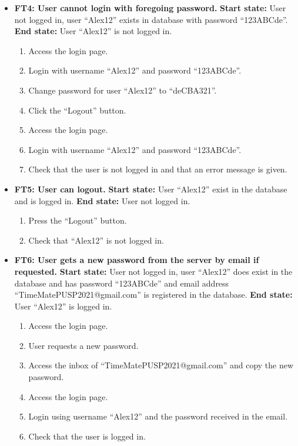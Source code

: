\documentclass{article}
\begin{document}
\begin{itemize}
		\item \textbf{FT4: User cannot login with foregoing password.} \newline
		\textbf{Start state:} User not logged in, user “Alex12” exists in database with password “123ABCde”.  \newline
		\textbf{End state:} User “Alex12” is not logged in.   
		\begin{enumerate}
			\item Access the login page. 
			\item Login with username “Alex12” and password “123ABCde”.
			\item Change password for user “Alex12” to “deCBA321”.
			\item Click the “Logout” button.
			\item Access the login page. 
			\item Login with username “Alex12” and password “123ABCde”.
			\item Check that the user is not logged in and that an error message is given. 
		\end{enumerate}
		
		\item \textbf{FT5: User can logout.} \newline
		\textbf{Start state:} User “Alex12” exist in the database and is logged in. \newline
		\textbf{End state:} User not logged in.   
		\begin{enumerate}
			\item Press the “Logout” button. 
			\item Check that “Alex12” is not logged in. 
		\end{enumerate}
		
		\item \textbf{FT6: User gets a new password from the server by email if requested.} \newline
		\textbf{Start state:} User not logged in, user “Alex12” does exist in the database and has password “123ABCde” and email address “TimeMatePUSP2021@gmail.com” is registered in the database.\newline
		\textbf{End state:}  User “Alex12” is logged in.  
		\begin{enumerate}
			\item Access the login page. 
			\item User requests a new password.
			\item Access the inbox of “TimeMatePUSP2021@gmail.com” and copy the new password.
			\item Access the login page.
			\item Login using username “Alex12” and the password received in the email.
			\item Check that the user is logged in. 
		\end{enumerate}
		

\end{itemize}
\end{document}
